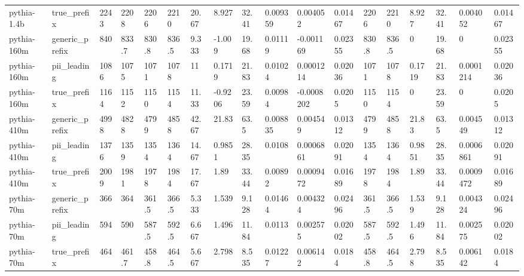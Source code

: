 \begin{tabular}{llllllllllllllllll}
pythia-1.4b & true\_prefix & 2243 & 2208 & 2206 & 2210 & 20.67 & 8.927 & 32.41 & 0.009359 & 0.004052 & 0.01467 & 2206 & 2210 & 8.927 & 32.41 & 0.004052 & 0.01467 \\
pythia-160m & generic\_prefix & 840 & 833.7 & 830.8 & 836.5 & 9.333 & -1.009 & 19.68 & 0.01119 & -0.001169 & 0.02355 & 830.8 & 836.5 & 0 & 19.68 & 0 & 0.02355 \\
pythia-160m & pii\_leading & 1086 & 1075 & 1071 & 1078 & 11 & 0.1719 & 21.83 & 0.01024 & 0.0001214 & 0.02036 & 1071 & 1078 & 0.1719 & 21.83 & 0.0001214 & 0.02036 \\
pythia-160m & true\_prefix & 1164 & 1152 & 1150 & 1154 & 11.33 & -0.9206 & 23.59 & 0.00984 & -0.0008202 & 0.0205 & 1150 & 1154 & 0 & 23.59 & 0 & 0.0205 \\
pythia-410m & generic\_prefix & 4998 & 4828 & 4799 & 4858 & 42.67 & 21.83 & 63.5 & 0.008835 & 0.004549 & 0.01312 & 4799 & 4858 & 21.83 & 63.5 & 0.004549 & 0.01312 \\
pythia-410m & pii\_leading & 1376 & 1359 & 1354 & 1364 & 14.67 & 0.9851 & 28.35 & 0.0108 & 0.0006861 & 0.02091 & 1354 & 1364 & 0.9851 & 28.35 & 0.0006861 & 0.02091 \\
pythia-410m & true\_prefix & 2009 & 1981 & 1978 & 1984 & 17.67 & 1.89 & 33.44 & 0.00892 & 0.0009472 & 0.01689 & 1978 & 1984 & 1.89 & 33.44 & 0.0009472 & 0.01689 \\
pythia-70m & generic\_prefix & 366 & 364 & 361.5 & 366.5 & 5.333 & 1.539 & 9.128 & 0.01464 & 0.004324 & 0.02496 & 361.5 & 366.5 & 1.539 & 9.128 & 0.004324 & 0.02496 \\
pythia-70m & pii\_leading & 594 & 590 & 587.5 & 592.5 & 6.667 & 1.496 & 11.84 & 0.0113 & 0.002575 & 0.02002 & 587.5 & 592.5 & 1.496 & 11.84 & 0.002575 & 0.02002 \\
pythia-70m & true\_prefix & 464 & 461.7 & 458.8 & 464.5 & 5.667 & 2.798 & 8.535 & 0.01227 & 0.006142 & 0.0184 & 458.8 & 464.5 & 2.798 & 8.535 & 0.006142 & 0.0184 \\
\bottomrule
\end{tabular}
